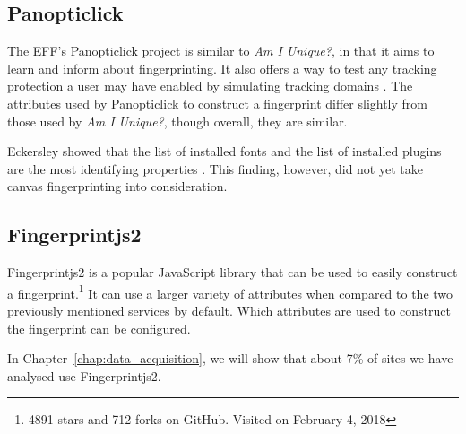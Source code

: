 \documentclass[
    fontsize=12pt,
    headings=small,
    parskip=half,
    bibliography=totoc,
    numbers=noenddot,
    open=any
    ]{scrreprt}
\begin{document}
\subsection{Panopticlick}
\label{related_work:panopticlick}
The EFF's Panopticlick project is similar to \textit{Am I Unique?}, in that it aims to learn and inform about
fingerprinting. It also offers a way to test any tracking protection a user may have enabled by simulating
tracking domains \cite{panopticlick}. The attributes used by Panopticlick to construct a fingerprint differ slightly from those used by
\textit{Am I Unique?}, though overall, they are similar.

Eckersley showed that the list of installed fonts and the list of installed plugins are the most identifying properties
\cite{eckersley2010unique}. This finding, however, did not yet take canvas fingerprinting into consideration.


\subsection{Fingerprintjs2}
\label{related_work:fingerprintjs2}
Fingerprintjs2 \cite{fingerprintjs2} is a popular JavaScript library that
can be used to easily construct a fingerprint.\footnote{4891 stars and 712 forks on GitHub. Visited on February 4, 2018}
It can use a larger variety of attributes when compared to the two previously mentioned services by default.
Which attributes are used to construct the fingerprint can be configured.

In Chapter~\ref{chap:data_acquisition}, we will show that about 7\% of sites we have analysed use Fingerprintjs2.
\end{document}
